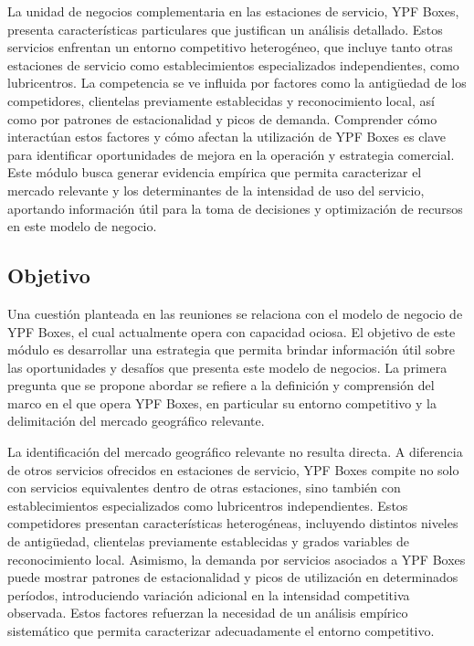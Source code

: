 
La unidad de negocios complementaria en las estaciones de servicio, YPF Boxes, presenta características particulares que justifican un análisis detallado. Estos servicios enfrentan un entorno competitivo heterogéneo, que incluye tanto otras estaciones de servicio como establecimientos especializados independientes, como lubricentros. La competencia se ve influida por factores como la antigüedad de los competidores, clientelas previamente establecidas y reconocimiento local, así como por patrones de estacionalidad y picos de demanda. Comprender cómo interactúan estos factores y cómo afectan la utilización de YPF Boxes es clave para identificar oportunidades de mejora en la operación y estrategia comercial. Este módulo busca generar evidencia empírica que permita caracterizar el mercado relevante y los determinantes de la intensidad de uso del servicio, aportando información útil para la toma de decisiones y optimización de recursos en este modelo de negocio.

\subsection{Objetivo}
Una cuestión planteada en las reuniones se relaciona con el modelo de negocio de YPF Boxes, el cual actualmente opera con capacidad ociosa. El objetivo de este módulo es desarrollar una estrategia que permita brindar información útil sobre las oportunidades y desafíos que presenta este modelo de negocios. La primera pregunta que se propone abordar se refiere a la definición y comprensión del marco en el que opera YPF Boxes, en particular su entorno competitivo y la delimitación del mercado geográfico relevante.

La identificación del mercado geográfico relevante no resulta directa. A diferencia de otros servicios ofrecidos en estaciones de servicio, YPF Boxes compite no solo con servicios equivalentes dentro de otras estaciones, sino también con establecimientos especializados como lubricentros independientes. Estos competidores presentan características heterogéneas, incluyendo distintos niveles de antigüedad, clientelas previamente establecidas y grados variables de reconocimiento local. Asimismo, la demanda por servicios asociados a YPF Boxes puede mostrar patrones de estacionalidad y picos de utilización en determinados períodos, introduciendo variación adicional en la intensidad competitiva observada. Estos factores refuerzan la necesidad de un análisis empírico sistemático que permita caracterizar adecuadamente el entorno competitivo.

